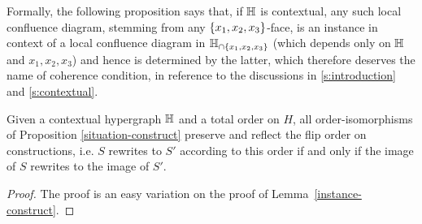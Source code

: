 Formally, the following proposition says that, if ${\mathbb H}$ is contextual, any such local confluence diagram, stemming from any $\left\{x_1,x_2,x_3\right\}$-face, is an instance in context of a local confluence diagram in ${\mathbb H}_{\cap \left\{x_1,x_2,x_3\right\}}$ (which depends only on ${\mathbb H}$ and ${x_1,x_2,x_3}$) and hence is determined by the latter, which therefore deserves the name of coherence condition, in reference to the discussions in \cref{s:introduction} and \cref{s:contextual}.

\begin{proposition} Given a contextual hypergraph ${\mathbb H}$ and a total order on $H$, all order-isomorphisms
of
Proposition \ref{situation-construct} preserve and reflect the flip order on constructions, i.e.  $S$ rewrites to $S'$ according to this order if and only if the image of $S$ rewrites to the image of $S'$.
\end{proposition}

\begin{proof} The proof is an easy variation on the proof of Lemma~\ref{instance-construct}. 
\end{proof}
